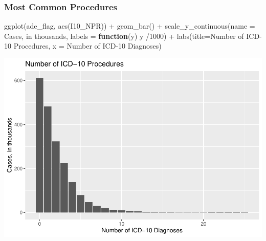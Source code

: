 \documentclass[preprint, 3p,
authoryear]{elsarticle} %
\newenvironment{Shaded}{\begin{snugshade}}{\end{snugshade}}
\newcommand{\AttributeTok}[1]{\textcolor[rgb]{0.77,0.63,0.00}{#1}}
\newcommand{\ControlFlowTok}[1]{\textcolor[rgb]{0.13,0.29,0.53}{\textbf{#1}}}
\newcommand{\DecValTok}[1]{\textcolor[rgb]{0.00,0.00,0.81}{#1}}
\newcommand{\FunctionTok}[1]{\textcolor[rgb]{0.00,0.00,0.00}{#1}}
\newcommand{\NormalTok}[1]{#1}
\newcommand{\SpecialCharTok}[1]{\textcolor[rgb]{0.00,0.00,0.00}{#1}}
\newcommand{\StringTok}[1]{\textcolor[rgb]{0.31,0.60,0.02}{#1}}
\begin{document}
\hypertarget{most-common-procedures}{%
\subsubsection{Most Common Procedures}\label{most-common-procedures}}

\begin{Shaded}
\begin{Highlighting}[]
\FunctionTok{ggplot}\NormalTok{(ade\_flag, }\FunctionTok{aes}\NormalTok{(I10\_NPR)) }\SpecialCharTok{+}
  \FunctionTok{geom\_bar}\NormalTok{() }\SpecialCharTok{+}
  \FunctionTok{scale\_y\_continuous}\NormalTok{(}\AttributeTok{name =} \StringTok{\textquotesingle{}Cases, in thousands\textquotesingle{}}\NormalTok{, }\AttributeTok{labels =} \ControlFlowTok{function}\NormalTok{(y) y }\SpecialCharTok{/}\DecValTok{1000}\NormalTok{) }\SpecialCharTok{+}
  \FunctionTok{labs}\NormalTok{(}\AttributeTok{title=}\StringTok{\textquotesingle{}Number of ICD{-}10 Procedures\textquotesingle{}}\NormalTok{, }\AttributeTok{x =} \StringTok{\textquotesingle{}Number of ICD{-}10 Diagnoses\textquotesingle{}}\NormalTok{) }
\end{Highlighting}
\end{Shaded}

\includegraphics{final-project-paper_files/figure-latex/n-procedures-1.pdf}
\end{document}
